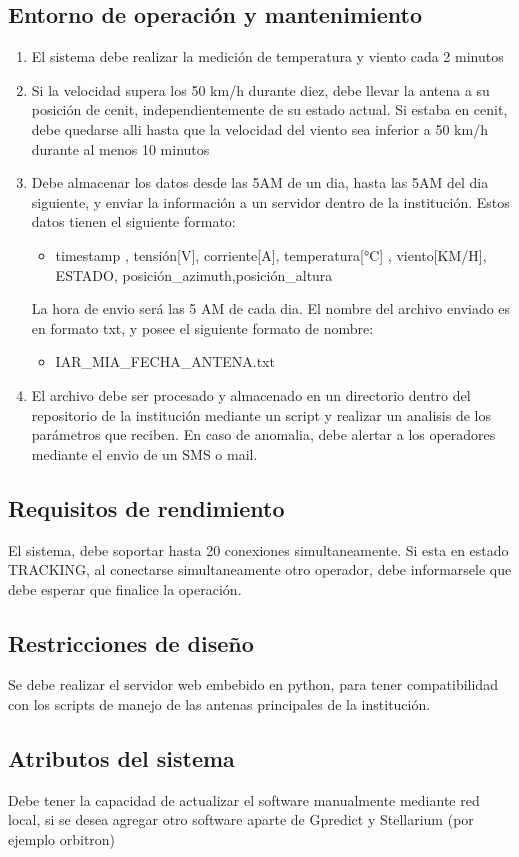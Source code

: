\documentclass[12pt,a4paper, twosite]{article}
\begin{document}
\subsection{Entorno de operación y mantenimiento}
\begin{enumerate}
	\item El sistema debe realizar la medición de temperatura y viento cada 2 minutos 
	\item Si la velocidad supera los 50 km/h durante diez, debe llevar la antena a su posición de cenit, independientemente de su estado actual. Si estaba en cenit, debe quedarse alli hasta que la velocidad del viento sea inferior a 50 km/h durante al menos 10 minutos
	\item Debe almacenar los datos desde las 5AM de un dia, hasta las 5AM del dia siguiente, y enviar la información a un servidor dentro de la institución. Estos datos tienen el siguiente formato: 
	\begin{itemize}
		\item timestamp , tensión[V], corriente[A], temperatura[°C] , viento[KM/H], ESTADO, posición\_azimuth,posición\_altura 
	\end{itemize}  
	La hora de envio será las 5 AM de cada dia. El nombre del archivo enviado es en formato txt, y posee el siguiente formato de nombre: 
	\begin{itemize}
		\item IAR\_MIA\_FECHA\_ANTENA.txt 
	\end{itemize} 
	\item El archivo debe ser procesado y almacenado en un directorio dentro del repositorio de la institución mediante un script y realizar un analisis de los parámetros que reciben. En caso de anomalia, debe alertar a los operadores mediante el envio de un SMS o mail.  
\end{enumerate}

	\subsection{Requisitos de rendimiento}
	\label{sec:org94bc543}
	
	El sistema, debe soportar hasta 20 conexiones simultaneamente. Si esta en estado TRACKING, al conectarse simultaneamente otro operador, debe informarsele que debe esperar que finalice la operación. 
	
	\subsection{Restricciones de diseño}
	\label{sec:org49fe900}
	
	Se debe realizar el servidor web embebido en python, para tener compatibilidad con los scripts de manejo de las antenas principales de la institución. 
	
	\subsection{Atributos del sistema}
	\label{sec:orgd0babc0}
	Debe tener la capacidad de actualizar el software manualmente mediante red local, si se desea agregar otro software aparte de Gpredict y Stellarium (por ejemplo orbitron)
	
\end{document}
